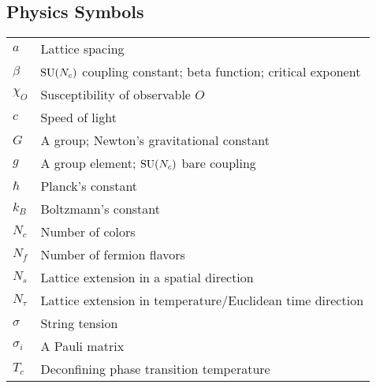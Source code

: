 \documentclass[12pt]{book}
\theoremstyle{definition}
\newenvironment{frontstuff}
  {\centering\chapter*{}}
  {\clearpage}
\begin{document}
\begin{frontstuff}
\section*{Physics Symbols}
\begin{tabular}{ll}
$a$             & Lattice spacing \\
$\beta$         & $\operatorname{SU}(N_c)$ coupling constant; beta function; critical exponent \\
$\chi_O$        & Susceptibility of observable $O$\\
$c$             & Speed of light\\
$G$             & A group; Newton's gravitational constant\\
$g$             & A group element; $\operatorname{SU}(N_c)$ bare coupling\\
$\hbar$         & Planck's constant \\
$k_B$           & Boltzmann's constant \\
$N_c$           & Number of colors \\
$N_f$           & Number of fermion flavors \\
$N_s$           & Lattice extension in a spatial direction \\
$N_\tau$        & Lattice extension in temperature/Euclidean time direction\\
$\sigma$        & String tension\\
$\sigma_i$      & A Pauli matrix\\
$T_c$           & Deconfining phase transition temperature\\
\end{tabular}
\clearpage


\end{frontstuff}
\end{document}
